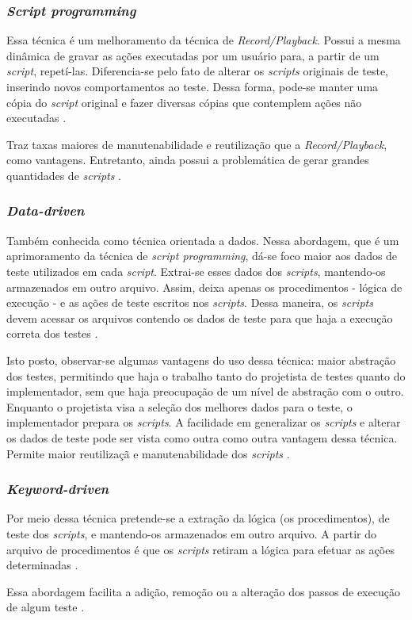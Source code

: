 \subsubsection{\textit{Script programming}}
Essa técnica é um melhoramento da técnica de \textit{Record/Playback}. Possui a mesma dinâmica de gravar as ações executadas por um usuário para, a partir de um \textit{script}, repetí-las. Diferencia-se pelo fato de alterar os \textit{scripts} originais de teste, inserindo novos comportamentos ao teste. Dessa forma, pode-se manter uma cópia do \textit{script} original e fazer diversas cópias que contemplem ações não executadas \cite{kent2007}.
\par
\indent Traz taxas maiores de manutenabilidade e reutilização que a \textit{Record/Playback}, como vantagens. Entretanto, ainda possui a problemática de gerar grandes quantidades de \textit{scripts} \cite{fantinatoEtAl2004}.
\subsubsection{\textit{Data-driven}}
Também conhecida como técnica orientada a dados. Nessa abordagem, que é um aprimoramento da técnica de \textit{script programming}, dá-se foco maior aos dados de teste utilizados em cada \textit{script}. Extrai-se esses dados dos \textit{scripts}, mantendo-os armazenados em outro arquivo. Assim, deixa apenas os procedimentos - lógica de execução - e as ações de teste escritos nos \textit{scripts}. Dessa maneira, os \textit{scripts} devem acessar os arquivos contendo os dados de teste para que haja a execução correta dos testes \cite{kent2007}.
\par
\indent Isto posto, observar-se algumas vantagens do uso dessa técnica: maior abstração dos testes, permitindo que haja o trabalho tanto do projetista de testes quanto do implementador, sem que haja preocupação de um nível de abstração com o outro. Enquanto o projetista visa a seleção dos melhores dados para o teste, o implementador prepara os \textit{scripts}. A facilidade em generalizar os \textit{scripts} e alterar os dados de teste pode ser vista como outra como outra vantagem dessa técnica. Permite maior reutilizaçã e manutenabilidade dos \textit{scripts} \cite{fantinatoEtAl2004}.
\subsubsection{\textit{Keyword-driven}}
Por meio dessa técnica pretende-se a extração da lógica (os procedimentos), de teste dos \textit{scripts}, e mantendo-os armazenados em outro arquivo. A partir do arquivo de procedimentos é que os \textit{scripts} retiram a lógica para efetuar as ações determinadas \cite{kent2007}.
\par
\indent Essa abordagem facilita a adição, remoção ou a alteração dos passos de execução de algum teste \cite{fantinatoEtAl2004}.
